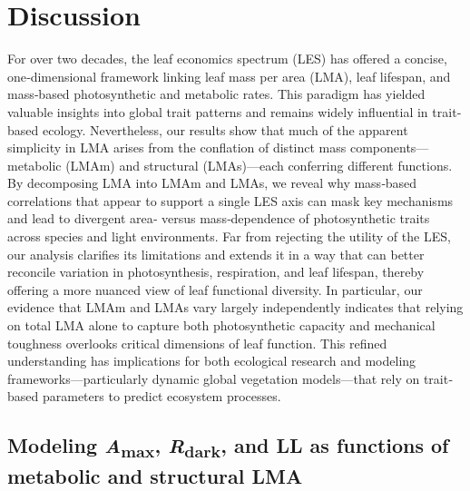 \documentclass[
  12pt,
  letterpaper,
  DIV=11,
  numbers=noendperiod]{scrartcl}
\begin{document}
\section{Discussion}\label{discussion}

For over two decades, the leaf economics spectrum (LES) has offered a
concise, one‐dimensional framework linking leaf mass per area (LMA),
leaf lifespan, and mass‐based photosynthetic and metabolic rates. This
paradigm has yielded valuable insights into global trait patterns and
remains widely influential in trait‐based ecology. Nevertheless, our
results show that much of the apparent simplicity in LMA arises from the
conflation of distinct mass components---metabolic (LMAm) and structural
(LMAs)---each conferring different functions. By decomposing LMA into
LMAm and LMAs, we reveal why mass‐based correlations that appear to
support a single LES axis can mask key mechanisms and lead to divergent
area‐ versus mass‐dependence of photosynthetic traits across species and
light environments. Far from rejecting the utility of the LES, our
analysis clarifies its limitations and extends it in a way that can
better reconcile variation in photosynthesis, respiration, and leaf
lifespan, thereby offering a more nuanced view of leaf functional
diversity. In particular, our evidence that LMAm and LMAs vary largely
independently indicates that relying on total LMA alone to capture both
photosynthetic capacity and mechanical toughness overlooks critical
dimensions of leaf function. This refined understanding has implications
for both ecological research and modeling frameworks---particularly
dynamic global vegetation models---that rely on trait‐based parameters
to predict ecosystem processes.　

\subsection{\texorpdfstring{Modeling \emph{A}\textsubscript{max},
\emph{R}\textsubscript{dark}, and LL as functions of metabolic and
structural
LMA}{Modeling Amax, Rdark, and LL as functions of metabolic and structural LMA}}\label{modeling-amax-rdark-and-ll-as-functions-of-metabolic-and-structural-lma}
\end{document}
